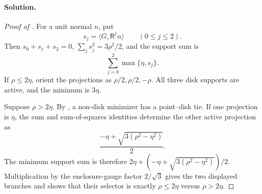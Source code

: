 

\paragraph{Solution.}

\begin{proof}[Proof of ]
For a unit normal $n$, put
\[
 s_j=\langle G,\mathsf R^jn\rangle\qquad(0\le j\le2).
\]
Then $s_0+s_1+s_2=0$, $\sum_js_j^2=3\rho^2/2$, and the support sum is
\[
 \sum_{j=0}^2\max\{\eta,s_j\}.
\]
If $\rho\le2\eta$, orient the projections as
$\rho/2,\rho/2,-\rho$.  All three disk supports are active, and the minimum
is $3\eta$.

Suppose $\rho>2\eta$.  By , a non-disk
minimizer has a point--disk tie.  If one projection is $\eta$, the sum and
sum-of-squares identities determine the other active projection as
\[
 \frac{-\eta+\sqrt{3(\rho^2-\eta^2)}}2.
\]
The minimum support sum is therefore
$2\eta+(-\eta+\sqrt{3(\rho^2-\eta^2)})/2$.  Multiplication by the
enclosure-gauge factor $2/\sqrt3$ gives the two displayed branches and shows
that their selector is exactly $\rho\le2\eta$ versus $\rho>2\eta$.
\end{proof}

